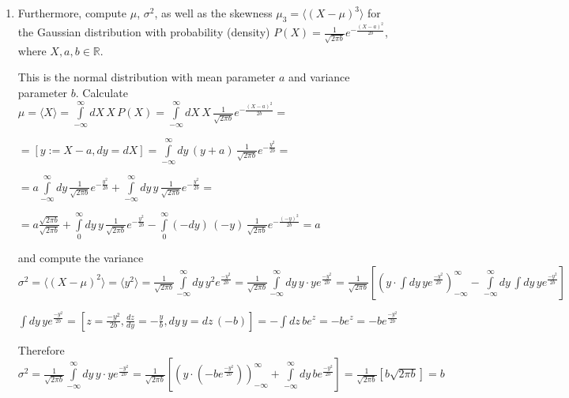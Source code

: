 \documentclass[11pt,a4paper]{scrartcl}
\begin{document}
\begin{enumerate}[label=(\alph*)]
\begin{calculationbox}
        Similar for terms $X = 0$, $X - 1 = 0$ can be ignoriert, so we get: $\langle X(X-1) \rangle = \lambda^2 e^{-\lambda} \sum\limits_{X=2}^\infty \frac{\lambda^{X-2}}{X-2!} = \lambda^2$. Therefore $\sigma^2 = \lambda^2 + \lambda - \lambda^2 = \lambda$
    \end{calculationbox}

    \item Furthermore, compute $\mu$, $\sigma^2$, as well as the skewness $\mu_3 = \langle (X - \mu)^3 \rangle$ for the Gaussian distribution with probability (density) $P(X) = \frac{1}{\sqrt{2\pi b}} e^{-\frac{(X - a)^2}{2b}}$, where $X, a, b \in \mathbb{R}$.

    \begin{calculationbox}
        This is the normal distribution with mean parameter $a$ and variance parameter $b$. Calculate $\mu = \langle X \rangle = \int\limits_{-\infty}^\infty dX\,  X \, P(X) = \int\limits_{-\infty}^\infty dX\,  X \,  \frac{1}{\sqrt{2\pi b}} e^{-\frac{(X - a)^2}{2b}} = $ 
        
        $= [y := X - a, dy = dX] = \int\limits_{-\infty}^\infty dy\,  (y + a) \,  \frac{1}{\sqrt{2\pi b}} e^{-\frac{y^2}{2b}} = $
        
        $= a\int\limits_{-\infty}^\infty dy\,  \frac{1}{\sqrt{2\pi b}} e^{-\frac{y^2}{2b}} + \int\limits_{-\infty}^\infty dy\,  y \,  \frac{1}{\sqrt{2\pi b}} e^{-\frac{y^2}{2b}} = $
        

        $=a\frac{\sqrt{2\pi b}}{\sqrt{2 \pi b}} + \int\limits_{0}^\infty dy\,  y \,  \frac{1}{\sqrt{2\pi b}} e^{-\frac{y^2}{2b}}  -\int\limits_{0}^\infty (-dy)\,  (-y) \,  \frac{1}{\sqrt{2\pi b}} e^{-\frac{(-y)^2}{2b}} = a$

        and compute the variance $\sigma^2 = \langle (X - \mu)^2 \rangle = \langle y^2 \rangle = \frac{1}{\sqrt{2\pi b}} \int\limits_{-\infty}^\infty dy\,y^2 e^{\frac{-y^2}{2b}} = \frac{1}{\sqrt{2\pi b}} \int\limits_{-\infty}^\infty dy\, y \cdot y e^{\frac{-y^2}{2b}} = \frac{1}{\sqrt{2\pi b}} \left[ \left(y \cdot \int dy\, y e^{\frac{-y^2}{2b}}\right)_{-\infty}^\infty - \int\limits_{-\infty}^\infty dy\,\int dy\, y e^{\frac{-y^2}{2b}}\right]$

        $\int dy\, y e^{\frac{-y^2}{2b}} = [z = \frac{-y^2}{2b}, \frac{dz}{dy} = -\frac{y}{b}, dy\,y = dz\, (-b)] = -\int dz\, b e^{z} = -b e^z = -b e^\frac{-y^2}{2b}$

        Therefore $\sigma^2 = \frac{1}{\sqrt{2\pi b}}  \int\limits_{-\infty}^\infty dy\, y \cdot y e^{\frac{-y^2}{2b}}=  \frac{1}{\sqrt{2\pi b}} \left[ \left(y \cdot (-b e^\frac{-y^2}{2b})\right)_{-\infty}^\infty + \int\limits_{-\infty}^\infty dy\,b e^\frac{-y^2}{2b}\right] = \frac{1}{\sqrt{2\pi b}}  [b\sqrt{2\pi b}] = b$


\end{calculationbox}
\end{enumerate}
\end{document}

